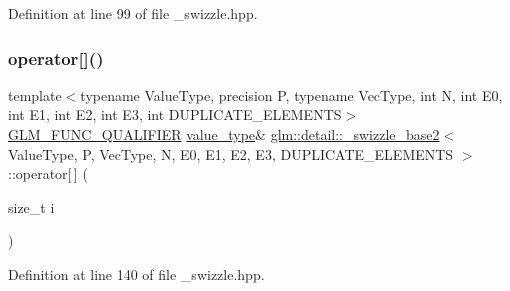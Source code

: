 Definition at line 99 of file \+\_\+swizzle.\+hpp.

\mbox{\label{structglm_1_1detail_1_1__swizzle__base2_aa3f2ab8e3e1a5c414b3fdca4cf75b706}} 
\subsubsection{\texorpdfstring{operator[]()}{operator[]()}\hspace{0.1cm}{\footnotesize\ttfamily [1/2]}}
{\footnotesize\ttfamily template$<$typename Value\+Type, precision P, typename Vec\+Type, int N, int E0, int E1, int E2, int E3, int D\+U\+P\+L\+I\+C\+A\+T\+E\+\_\+\+E\+L\+E\+M\+E\+N\+TS$>$ \\
\hyperlink{setup_8hpp_a33fdea6f91c5f834105f7415e2a64407}{G\+L\+M\+\_\+\+F\+U\+N\+C\+\_\+\+Q\+U\+A\+L\+I\+F\+I\+ER} \hyperlink{structglm_1_1detail_1_1__swizzle__base2_a656c11aaeeaca042deed88711c9dc063}{value\+\_\+type}\& \hyperlink{structglm_1_1detail_1_1__swizzle__base2}{glm\+::detail\+::\+\_\+swizzle\+\_\+base2}$<$ Value\+Type, P, Vec\+Type, N, E0, E1, E2, E3, D\+U\+P\+L\+I\+C\+A\+T\+E\+\_\+\+E\+L\+E\+M\+E\+N\+TS $>$\+::operator\mbox{[}$\,$\mbox{]} (\begin{DoxyParamCaption}\item[{size\+\_\+t}]{i }\end{DoxyParamCaption})\hspace{0.3cm}{\ttfamily [inline]}}



Definition at line 140 of file \+\_\+swizzle.\+hpp.

\mbox{\label{structglm_1_1detail_1_1__swizzle__base2_a8ec8dce75738c37d06b96d18dec0adb5}} 
